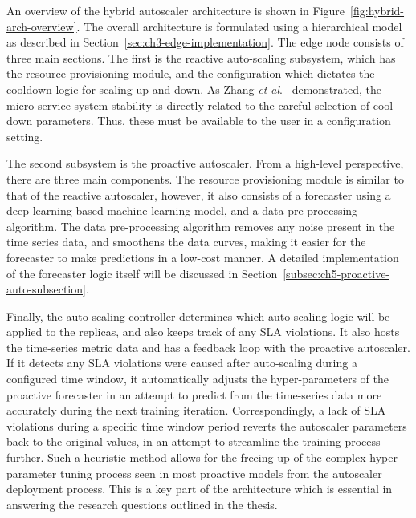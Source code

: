An overview of the hybrid autoscaler architecture is shown in Figure~\ref{fig:hybrid-arch-overview}. The overall architecture is formulated using a hierarchical model as described in Section~\ref{sec:ch3-edge-implementation}. The edge node consists of three main sections. The first is the reactive auto-scaling subsystem, which has the resource provisioning module, and the configuration which dictates the cooldown logic for scaling up and down. As Zhang \textit{et al}.~\cite{zhang2019quantifying} demonstrated, the micro-service system stability is directly related to the careful selection of cool-down parameters. Thus, these must be available to the user in a configuration setting.\par

The second subsystem is the proactive autoscaler. From a high-level perspective, there are three main components. The resource provisioning module is similar to that of the reactive autoscaler, however, it also consists of a forecaster using a deep-learning-based machine learning model, and a data pre-processing algorithm. The data pre-processing algorithm removes any noise present in the time series data, and smoothens the data curves, making it easier for the forecaster to make predictions in a low-cost manner. A detailed implementation of the forecaster logic itself will be discussed in Section~\ref{subsec:ch5-proactive-auto-subsection}.\par

Finally, the auto-scaling controller determines which auto-scaling logic will be applied to the replicas, and also keeps track of any SLA violations. It also hosts the time-series metric data and has a feedback loop with the proactive autoscaler. If it detects any SLA violations were caused after auto-scaling during a configured time window, it automatically adjusts the hyper-parameters of the proactive forecaster in an attempt to predict from the time-series data more accurately during the next training iteration. Correspondingly, a lack of SLA violations during a specific time window period reverts the autoscaler parameters back to the original values, in an attempt to streamline the training process further. Such a heuristic method allows for the freeing up of the complex hyper-parameter tuning process seen in most proactive models from the autoscaler deployment process. This is a key part of the architecture which is essential in answering the research questions outlined in the thesis.\par


